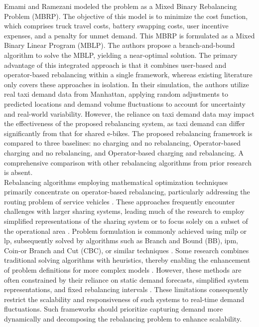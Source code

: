 Emami and Ramezani modeled the problem as a Mixed Binary Rebalancing Problem (MBRP).
The objective of this model is to minimize the cost function, which comprises truck travel costs, battery swapping costs, user incentive expenses, and a penalty for unmet demand.
This MBRP is formulated as a Mixed Binary Linear Program (MBLP).
The authors propose a branch-and-bound algorithm to solve the MBLP, yielding a near-optimal solution.
The primary advantage of this integrated approach is that it combines user-based and operator-based rebalancing within a single framework, whereas existing literature only covers these approaches in isolation.
In their simulation, the authors utilize real taxi demand data from Manhattan, applying random adjustments to predicted locations and demand volume fluctuations to account for uncertainty and real-world variability.
However, the reliance on taxi demand data may impact the effectiveness of the proposed rebalancing system, as taxi demand can differ significantly from that for shared e-bikes.
The proposed rebalancing framework is compared to three baselines: no charging and no rebalancing, Operator-based charging and no rebalancing, and Operator-based charging and rebalancing.
A comprehensive comparison with other rebalancing algorithms from prior research is absent.
\\

Rebalancing algorithms employing mathematical optimization techniques primarily concentrate on operator-based rebalancing, particularly addressing the routing problem of service vehicles \cite{jimenez-merono_optimization_2024, lee_battery_2024, schroer_online_2019}.
These approaches frequently encounter challenges with larger sharing systems, leading much of the research to employ simplified representations of the sharing system or to focus solely on a subset of the operational area \cite{dellamico_bike_2014}.
Problem formulation is commonly achieved using \gls{milp} or \gls{lp}, subsequently solved by algorithms such as Branch and Bound (BB), \gls{ipm}, Coin-or Branch and Cut (CBC), or similar techniques \cite{jimenez-merono_optimization_2024, villa-zapata_incorporating_2024, sanchez_simulation_2022}.
Some research combines traditional solving algorithms with heuristics, thereby enabling the enhancement of problem definitions for more complex models \cite{saum_optimizing_2024}.
However, these methods are often constrained by their reliance on static demand forecasts, simplified system representations, and fixed rebalancing intervals \cite{saum_optimizing_2024}.
These limitations consequently restrict the scalability and responsiveness of such systems to real-time demand fluctuations.
Such frameworks should prioritize capturing demand more dynamically and decomposing the rebalancing problem to enhance scalability.\\

